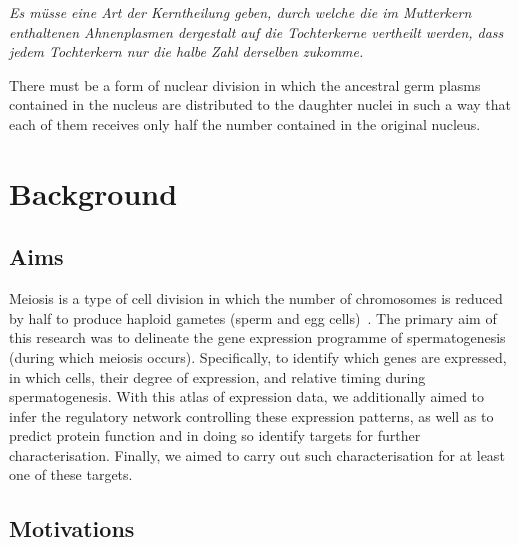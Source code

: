 \begin{savequote}[8cm]
\textit{Es müsse eine Art der Kerntheilung geben, durch welche die im Mutterkern enthaltenen Ahnenplasmen dergestalt auf die Tochterkerne vertheilt werden, dass jedem Tochterkern nur die halbe Zahl derselben zukomme.}

There must be a form of nuclear division in which the ancestral germ plasms contained in the nucleus are distributed to the daughter nuclei in such a way that each of them receives only half the number contained in the original nucleus.
\end{savequote}

\chapter{\label{ch:1-intro}Background}

\minitoc


\section{Aims}
Meiosis is a type of cell division in which the number of chromosomes is reduced by half to produce haploid gametes (sperm and egg cells)~\parencite{Ohkura2015Meiosis}. The primary aim of this research was to delineate the gene expression programme of spermatogenesis (during which meiosis occurs). Specifically, to identify which genes are expressed, in which cells, their degree of expression, and relative timing during spermatogenesis. With this atlas of expression data, we additionally aimed to infer the regulatory network controlling these expression patterns, as well as to predict protein function and in doing so identify targets for further characterisation. Finally, we aimed to carry out such characterisation for at least one of these targets.


\section{Motivations}

